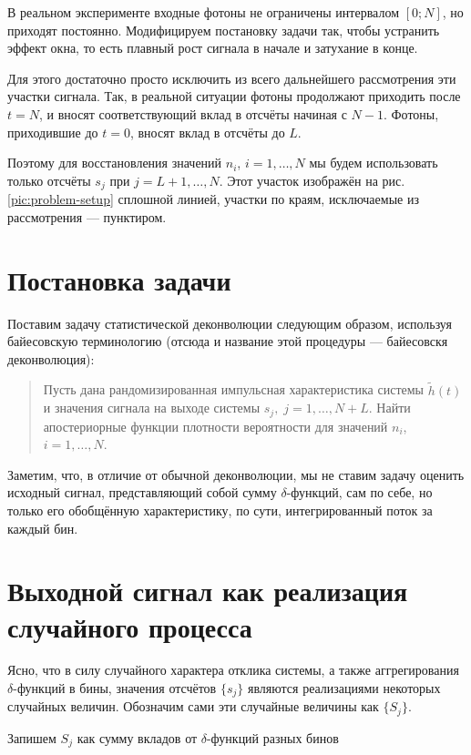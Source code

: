 В реальном эксперименте входные фотоны не ограничены интервалом $[0; N]$, но приходят постоянно. Модифицируем постановку задачи так, чтобы устранить эффект окна, то есть плавный рост сигнала в начале и затухание в конце.

Для этого достаточно просто исключить из всего дальнейшего рассмотрения эти участки сигнала. Так, в реальной ситуации фотоны продолжают приходить после $t=N$, и вносят соответствующий вклад в отсчёты начиная с $N-1$. Фотоны, приходившие до $t=0$, вносят вклад в отсчёты до $L$.

Поэтому для восстановления значений $n_i$, $i = 1, \ldots, N$ мы будем использовать только отсчёты $s_j$ при $j = L+1, \ldots, N$. Этот участок изображён на рис. \ref{pic:problem-setup} сплошной линией, участки по краям, исключаемые из рассмотрения --- пунктиром.


\section{Постановка задачи}

Поставим задачу статистической деконволюции следующим образом, используя байесовскую терминологию (отсюда и название этой процедуры --- байесовскя деконволюция):

\begin{quote}
	Пусть дана рандомизированная импульсная характеристика системы $\tilde{h}(t)$ и значения сигнала на выходе системы $s_j, \; j = 1, \ldots, N + L$. Найти апостериорные функции плотности вероятности для значений $n_i$, $i = 1, \ldots, N$.
\end{quote}

Заметим, что, в отличие от обычной деконволюции, мы не ставим задачу оценить исходный сигнал, представляющий собой сумму $\delta$-функций, сам по себе, но только его обобщённую характеристику, по сути, интегрированный поток за каждый бин.

\section{Выходной сигнал как реализация случайного процесса}

Ясно, что в силу случайного характера отклика системы, а также аггрегирования $\delta$-функций в бины, значения отсчётов $\{ s_j \}$ являются реализациями некоторых случайных величин. Обозначим сами эти случайные величины как $\{ S_j \}$.

Запишем $S_j$ как сумму вкладов от $\delta$-функций разных бинов

